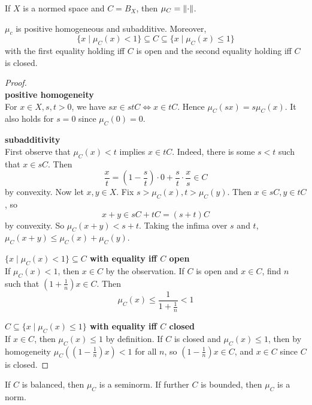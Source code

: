 \documentclass{article}
\begin{document}
\begin{eg}
  If $X$ is a normed space and $C = B_X$, then $\mu_C = \left\lVert \cdot\right\rVert$.
\end{eg}

\begin{nlemma}\label{lem:ball-gauge}
  $\mu_c$ is positive homogeneous and subadditive. Moreover,
  $$\{x \mid \mu_C(x) < 1\} \subseteq C \subseteq \{x \mid \mu_C(x) \le 1\}$$
  with the first equality holding iff $C$ is open and the second equality holding iff $C$ is closed.
\end{nlemma}
\begin{proof}~\\
  {\bf positive homogeneity} \\
  For $x \in X, s, t > 0$, we have $sx \in stC \iff x \in tC$. Hence
  $\mu_C(sx) = s\mu_C(x)$. It also holds for $s = 0$ since $\mu_C(0) = 0$.

  {\bf subadditivity} \\
  First observe that $\mu_C(x) < t$ implies $x \in tC$. Indeed, there is some $s < t$ such that $x \in sC$. Then
  $$\frac xt = \left(1 - \frac st\right) \cdot 0 + \frac st \cdot  \frac xs \in C$$
  by convexity. Now let $x, y \in X$. Fix $s > \mu_C(x), t > \mu_C(y)$. Then $x \in sC, y \in tC$, so
  $$x + y \in sC + tC = (s + t)C$$
  by convexity. So $\mu_C(x + y) < s + t$. Taking the infima over $s$ and $t$, $\mu_C(x + y) \le \mu_C(x) + \mu_C(y)$.

  {\bf $\{x \mid \mu_C(x) < 1\} \subseteq C$ with equality iff $C$ open} \\
  If $\mu_C(x) < 1$, then $x \in C$ by the observation. If $C$ is open and $x \in C$, find $n$ such that $\left(1 + \frac 1n\right)x \in C$. Then
  $$\mu_C(x) \le \frac 1{1 + \frac 1n} < 1$$

  {\bf $C \subseteq \{x \mid \mu_C(x) \le 1\}$ with equality iff $C$ closed} \\
  If $x \in C$, then $\mu_C(x) \le 1$ by definition. If $C$ is closed and $\mu_C(x) \le 1$, then by homogeneity $\mu_C\left(\left(1 - \frac 1n\right)x\right) < 1$ for all $n$, so $\left(1 - \frac 1n\right)x \in C$, and $x \in C$ since $C$ is closed.  
\end{proof}

\begin{rmk}
  If $C$ is balanced, then $\mu_C$ is a seminorm. If further $C$ is bounded, then $\mu_C$ is a norm.
\end{rmk}
\end{document}
